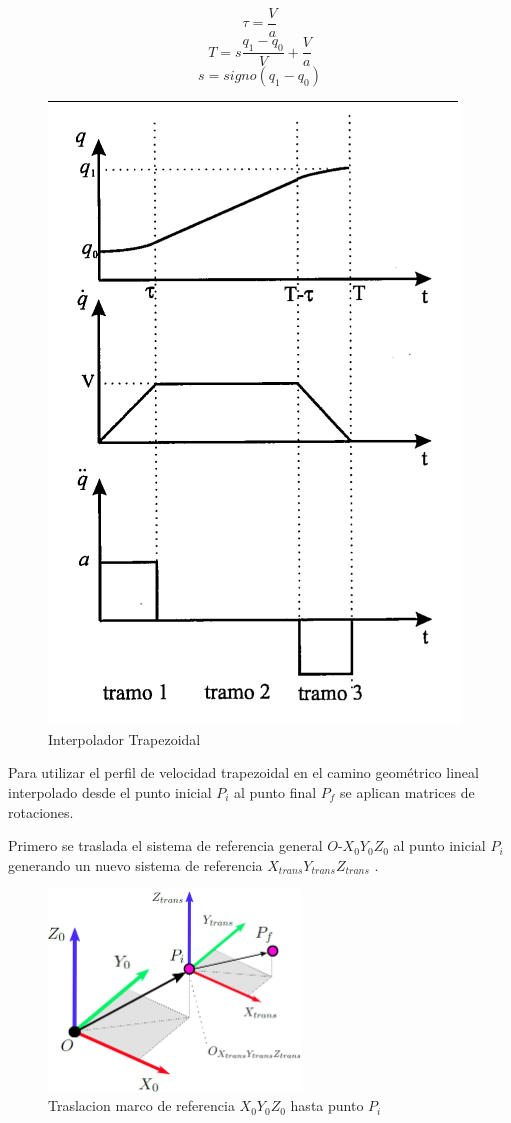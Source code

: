     \begin{equation}
        \tau=\frac{V}{a}
    \label{eq:cap6_tray_4}
    \end{equation}
    \begin{equation}
        T=s\frac{q_1-q_0}{V}+\frac{V}{a}
    \label{eq:cap6_tray_5}
    \end{equation}
    \begin{equation}
        s=signo(q_1-q_0)
    \label{eq:cap6_tray_6}
    \end{equation}
    

     \begin{figure}[htb]
            \centering
            \includegraphics[width=0.5\linewidth]{Main/Chapter6/Images6/cap6_trayectory_2.png}
            \caption{Interpolador Trapezoidal \cite{tray_trape}}
            \label{f:cap6_trayectory_2}
        \end{figure} 
    \newpage

    Para utilizar el perfil de velocidad trapezoidal en el camino geométrico lineal interpolado desde el punto inicial $P_i$ al punto final $P_f$ se aplican matrices de rotaciones. 
    
       Primero se traslada el sistema de referencia general $O$-$X_0Y_0Z_0$ al punto inicial $P_i$ generando un nuevo sistema de referencia $X_{trans}Y_{trans}Z_{trans}$ .
        
        \begin{figure}[htb]
                \centering
                \includegraphics[width=0.6\textwidth]{Main/Chapter6/Images6/DIBUJO531.jpg}
                \caption{Traslacion marco de referencia $X_0Y_0Z_0$ hasta punto $P_i$}
        \end{figure}

